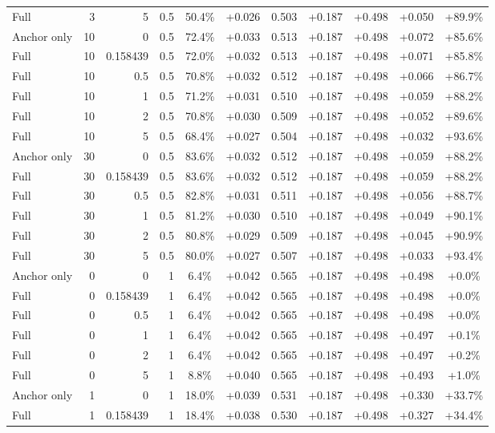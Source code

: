 \begin{table}[htbp]
\begin{tabular}{lrrrccccccc}
Full & 3 & 5 & 0.5 & 50.4\% & +0.026 & 0.503 & +0.187 & +0.498 & +0.050 & +89.9\% \\
Anchor only & 10 & 0 & 0.5 & 72.4\% & +0.033 & 0.513 & +0.187 & +0.498 & +0.072 & +85.6\% \\
Full & 10 & 0.158439 & 0.5 & 72.0\% & +0.032 & 0.513 & +0.187 & +0.498 & +0.071 & +85.8\% \\
Full & 10 & 0.5 & 0.5 & 70.8\% & +0.032 & 0.512 & +0.187 & +0.498 & +0.066 & +86.7\% \\
Full & 10 & 1 & 0.5 & 71.2\% & +0.031 & 0.510 & +0.187 & +0.498 & +0.059 & +88.2\% \\
Full & 10 & 2 & 0.5 & 70.8\% & +0.030 & 0.509 & +0.187 & +0.498 & +0.052 & +89.6\% \\
Full & 10 & 5 & 0.5 & 68.4\% & +0.027 & 0.504 & +0.187 & +0.498 & +0.032 & +93.6\% \\
Anchor only & 30 & 0 & 0.5 & 83.6\% & +0.032 & 0.512 & +0.187 & +0.498 & +0.059 & +88.2\% \\
Full & 30 & 0.158439 & 0.5 & 83.6\% & +0.032 & 0.512 & +0.187 & +0.498 & +0.059 & +88.2\% \\
Full & 30 & 0.5 & 0.5 & 82.8\% & +0.031 & 0.511 & +0.187 & +0.498 & +0.056 & +88.7\% \\
Full & 30 & 1 & 0.5 & 81.2\% & +0.030 & 0.510 & +0.187 & +0.498 & +0.049 & +90.1\% \\
Full & 30 & 2 & 0.5 & 80.8\% & +0.029 & 0.509 & +0.187 & +0.498 & +0.045 & +90.9\% \\
Full & 30 & 5 & 0.5 & 80.0\% & +0.027 & 0.507 & +0.187 & +0.498 & +0.033 & +93.4\% \\
Anchor only & 0 & 0 & 1 & 6.4\% & +0.042 & 0.565 & +0.187 & +0.498 & +0.498 & +0.0\% \\
Full & 0 & 0.158439 & 1 & 6.4\% & +0.042 & 0.565 & +0.187 & +0.498 & +0.498 & +0.0\% \\
Full & 0 & 0.5 & 1 & 6.4\% & +0.042 & 0.565 & +0.187 & +0.498 & +0.498 & +0.0\% \\
Full & 0 & 1 & 1 & 6.4\% & +0.042 & 0.565 & +0.187 & +0.498 & +0.497 & +0.1\% \\
Full & 0 & 2 & 1 & 6.4\% & +0.042 & 0.565 & +0.187 & +0.498 & +0.497 & +0.2\% \\
Full & 0 & 5 & 1 & 8.8\% & +0.040 & 0.565 & +0.187 & +0.498 & +0.493 & +1.0\% \\
Anchor only & 1 & 0 & 1 & 18.0\% & +0.039 & 0.531 & +0.187 & +0.498 & +0.330 & +33.7\% \\
Full & 1 & 0.158439 & 1 & 18.4\% & +0.038 & 0.530 & +0.187 & +0.498 & +0.327 & +34.4\% \\

\end{tabular}
\end{table}
